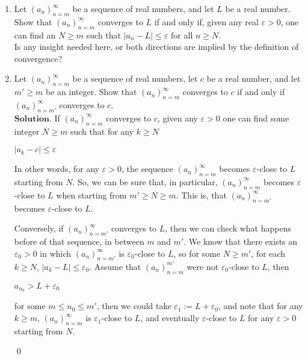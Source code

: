 \documentclass{article}
\theoremstyle{remark}
\begin{document}
\begin{enumerate}
            \item Let \( (a_n)_{n=m}^{\infty} \) be a sequence of real numbers, and let \( L \) be a real number. Show that \( (a_n)_{n=m}^{\infty} \) converges to \( L \) if and only if, given any real \( \varepsilon > 0 \), one can find an \( N \geq m \) such that \( |a_n - L| \leq \varepsilon \) for all \( n \geq N \).\\
            Is any insight needed here, or both directions are implied by the definition of convergence?

            \item Let \( (a_n)_{n=m}^{\infty} \) be a sequence of real numbers, let \( c \) be a real number, and let \( m' \geq m \) be an integer. Show that \( (a_n)_{n=m}^{\infty} \) converges to \( c \) if and only if \( (a_n)_{n=m'}^{\infty} \) converges to \( c \).\\
            $\textbf{Solution.}$
            If $(a_n)_{n=m}^{\infty}$ converges to $c$, given any $\varepsilon > 0$ one can find some integer $N \geq m$ such that 
            for any $k \geq N$
            \begin{center}
                $\displaystyle \vert a_k - c \vert \leq \varepsilon$
            \end{center}
            In other words, for any $\varepsilon > 0$, the sequence $(a_n)_{n=m}^{\infty}$ becomes $\varepsilon$-close to $L$ starting from $N$.
            So, we can be sure that, in particular, $(a_n)_{n=m}^{\infty}$ becomes $\varepsilon$-close to $L$ when starting from $m' \geq N \geq m$.
            This is, that $(a_n)_{n=m'}^{\infty}$ becomes $\varepsilon$-close to $L$.

            Conversely, if $(a_n)_{n=m'}^{\infty}$ converges to $L$, then we can check what happens before of that sequence, in between $m$ and $m'$.
            We know that there exists an $\varepsilon_0 > 0$ in which $(a_n)_{n=m'}^{\infty}$ is $\varepsilon_0$-close to $L$,
            so for some $N \geq m'$, for each $k \geq N$, $\vert a_k - L \vert \leq \varepsilon_0$.
            Assume that $(a_n)_{n=m}^{m'}$ were not $\varepsilon_0$-close to $L$, then
            \begin{center}
                $\displaystyle a_{n_0} > L + \varepsilon_0$
            \end{center}
            for some $m \leq n_0 \leq m'$, then we could take $\varepsilon_1 := L + \varepsilon_0$, and note that for any $k \geq m$,
            $(a_n)_{n=m}^{\infty}$ is $\varepsilon_1$-close to $L$, and eventually $\varepsilon$-close to $L$ for any $\varepsilon > 0$ starting from $N$.
            \begin{flushright}
                \qed
            \end{flushright}


\end{enumerate}
\end{document}
